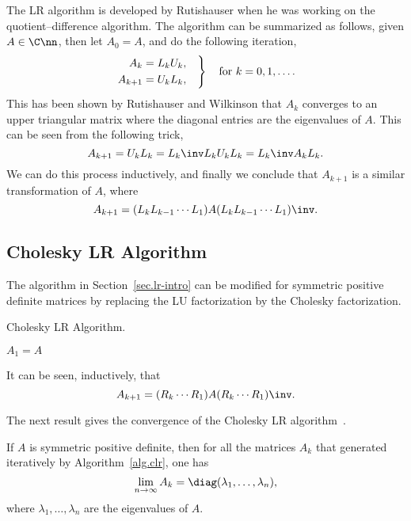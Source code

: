 The LR algorithm is developed by Rutishauser when he was working on the
quotient--difference algorithm. The algorithm can be summarized as follows,
given $A\in\C\nn$, then let $A_{0} = A$, and do the following iteration,
\begin{equation}\notag
  \left.
  \begin{aligned}
    A_{k} & = L_{k} U_{k},\quad  \\
    A_{k+1} & =  U_{k}L_{k},
  \end{aligned}
  \right\} \quad \text{for $k = 0,1,\dots.$}
\end{equation}
This has been shown by Rutishauser and Wilkinson that $A_{k}$ converges to
an upper triangular matrix where the diagonal entries are the eigenvalues
of $A$. This can be seen from the following trick,
\begin{equation}\notag
  A_{k+1} = U_{k}L_{k} = L_{k}\inv L_{k}U_{k}L_{k} = L_{k}\inv A_{k} L_{k}.
\end{equation}
We can do this process inductively, and finally we conclude that $A_{k+1}$
is a similar transformation of $A$, where
\begin{equation}\notag
  A_{k+1} = (L_{k}L_{k-1}\cdots L_{1}) A (L_{k}L_{k-1}\cdots L_{1})\inv.  
\end{equation}

\subsection{Cholesky LR Algorithm}
\label{sec.chol-lr-algor}
The algorithm in Section~\ref{sec.lr-intro} can be modified for symmetric
positive definite matrices by replacing the LU factorization by the
Cholesky factorization.
\begin{algorithm}
\caption{Cholesky LR Algorithm.}
\label{alg.clr}
\begin{algorithmic}[1]
\State $A_{1} = A$
\EndFor
\end{algorithmic}
\end{algorithm}

It can be seen, inductively, that
\begin{equation}\label{eq.alg4-decomp}
  A_{k+1} = (R_{k}\cdots R_{1})A(R_{k} \cdots R_{1})\inv.
\end{equation}

The next result gives the convergence of the Cholesky LR
algorithm~.
\begin{theorem}
\label{thm.conv-chol-lr}
If $A$ is symmetric positive definite, then for all the matrices $A_{k}$
that generated iteratively by Algorithm~\ref{alg.clr}, one has
\begin{equation}\notag
  \lim_{n\to\infty} A_{k} = \diag(\lambda_{1},\dots,\lambda_{n}),
\end{equation}
where $\lambda_{1},\dots,\lambda_{n}$ are the eigenvalues of $A$.
\end{theorem}

